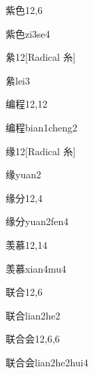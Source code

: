 \begin{entry}{紫色}{12,6}
  \begin{phonetics}{紫色}{zi3se4}
  \end{phonetics}
\end{entry}

\begin{entry}{絫}{12}[Radical 糸]
  \begin{phonetics}{絫}{lei3}
  \end{phonetics}
\end{entry}

\begin{entry}{编程}{12,12}
  \begin{phonetics}{编程}{bian1cheng2}
  \end{phonetics}
\end{entry}

\begin{entry}{缘}{12}[Radical 糸]
  \begin{phonetics}{缘}{yuan2}
  \end{phonetics}
\end{entry}

\begin{entry}{缘分}{12,4}
  \begin{phonetics}{缘分}{yuan2fen4}
  \end{phonetics}
\end{entry}

\begin{entry}{羡慕}{12,14}
  \begin{phonetics}{羡慕}{xian4mu4}
  \end{phonetics}
\end{entry}

\begin{entry}{联合}{12,6}
  \begin{phonetics}{联合}{lian2he2}
  \end{phonetics}
\end{entry}

\begin{entry}{联合会}{12,6,6}
  \begin{phonetics}{联合会}{lian2he2hui4}
  \end{phonetics}
\end{entry}

